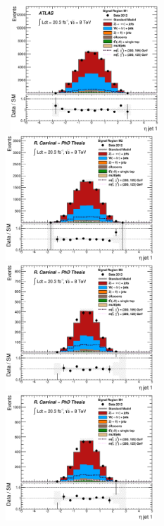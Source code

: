 \begin{figure}[!ht]
  \begin{center}
    \mbox{
      \includegraphics[width=0.495\textwidth]{MonojetAnalysis/Figures/plot_Stop_A6_SR_eta1_fitted.eps}
      \includegraphics[width=0.495\textwidth]{MonojetAnalysis/Figures/plot_Stop_A3_SR_eta1_fitted.eps}
    }
    \mbox{
      \includegraphics[width=0.495\textwidth]{MonojetAnalysis/Figures/plot_Stop_A4_SR_eta1_fitted.eps}
      \includegraphics[width=0.495\textwidth]{MonojetAnalysis/Figures/plot_Stop_A8_SR_eta1_fitted.eps}
}
\end{center}
\end{figure}
